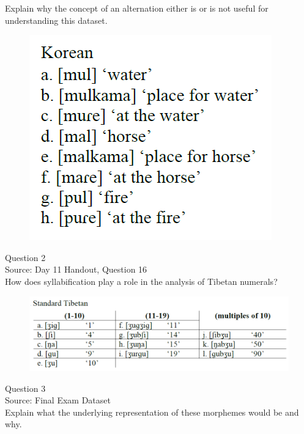 \documentclass[12pt]{article}
\begin{document}
Explain why the concept of an alternation either is or is not useful for understanding this dataset.\\

\begin{figure}[H]
\includegraphics{../images/korean.png}
\end{figure}

\newpage

{\large Question 2}\\

Source: Day 11 Handout, Question 16\\

How does syllabification play a role in the analysis of Tibetan numerals?\\

\begin{figure}[H]
\includegraphics{../images/tibetan.png}
\end{figure}

\newpage

{\large Question 3}\\

Source: Final Exam Dataset\\

Explain what the underlying representation of these morphemes would be and why.\\
\end{document}
